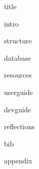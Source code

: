 \documentclass[titlepage,a4paper,openany]{report}
\begin{document}
{title}
\newpage
\tableofcontents
\newpage
\listoffigures
\newpage

{intro}

{structure}

{database}

{resources}

{userguide}

{devguide}

{reflections}

{bib}

{appendix}
\end{document}
